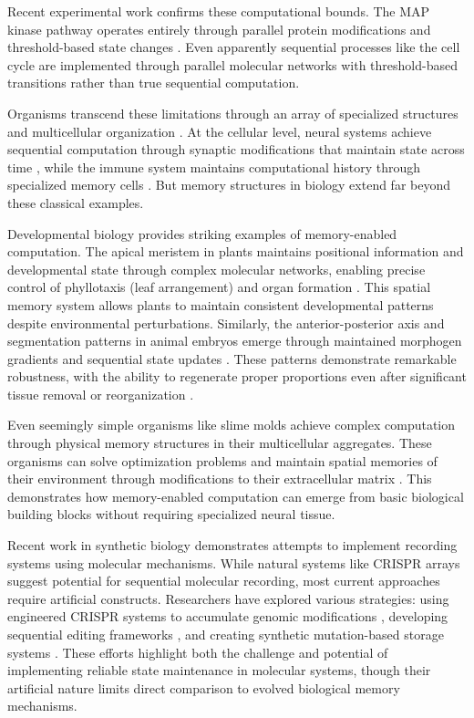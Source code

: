 \documentclass[12pt]{article}
\begin{document}
Recent experimental work confirms these computational bounds.
The MAP kinase pathway operates entirely through parallel protein modifications and threshold-based state changes \cite{alberts2022molecular}.
Even apparently sequential processes like the cell cycle are implemented through parallel molecular networks with threshold-based transitions rather than true sequential computation.

Organisms transcend these limitations through an array of specialized structures and multicellular organization \cite{espinosa2024molecular}.
At the cellular level, neural systems achieve sequential computation through synaptic modifications that maintain state across time \cite{fu2024memory}, while the immune system maintains computational history through specialized memory cells \cite{niu2022computational}.
But memory structures in biology extend far beyond these classical examples.

Developmental biology provides striking examples of memory-enabled computation.
The apical meristem in plants maintains positional information and developmental state through complex molecular networks, enabling precise control of phyllotaxis (leaf arrangement) and organ formation \cite{lovkvist2021using}.
This spatial memory system allows plants to maintain consistent developmental patterns despite environmental perturbations.
Similarly, the anterior-posterior axis and segmentation patterns in animal embryos emerge through maintained morphogen gradients and sequential state updates \cite{pastor2020computation}.
These patterns demonstrate remarkable robustness, with the ability to regenerate proper proportions even after significant tissue removal or reorganization \cite{lobo2012towards}.

Even seemingly simple organisms like slime molds achieve complex computation through physical memory structures in their multicellular aggregates.
These organisms can solve optimization problems and maintain spatial memories of their environment through modifications to their extracellular matrix \cite{hoel2020emergence}.
This demonstrates how memory-enabled computation can emerge from basic biological building blocks without requiring specialized neural tissue.

Recent work in synthetic biology demonstrates attempts to implement recording systems using molecular mechanisms.
While natural systems like CRISPR arrays suggest potential for sequential molecular recording, most current approaches require artificial constructs.
Researchers have explored various strategies: using engineered CRISPR systems to accumulate genomic modifications \cite{sheth2017multiplex}, developing sequential editing frameworks \cite{choi2022time}, and creating synthetic mutation-based storage systems \cite{sadremomtaz2023digital}.
These efforts highlight both the challenge and potential of implementing reliable state maintenance in molecular systems, though their artificial nature limits direct comparison to evolved biological memory mechanisms.
\end{document}
